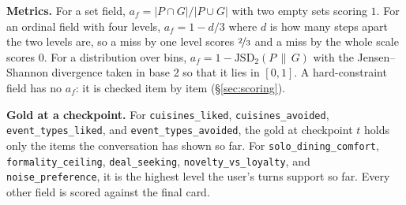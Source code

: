 \documentclass{article}
\begin{document}
\textbf{Metrics.} For a set field, $a_f=|P\cap G|/|P\cup G|$ with two empty sets scoring $1$.
For an ordinal field with four levels, $a_f=1-d/3$ where $d$ is how many steps apart
the two levels are, so a miss by one level scores $\nicefrac{2}{3}$ and a miss by the whole scale scores
$0$. For a distribution over bins,
$a_f=1-\mathrm{JSD}_2(P\,\|\,G)$ with the Jensen--Shannon divergence taken in base 2 so that it
lies in $[0,1]$. A hard-constraint field has no $a_f$: it is checked item by item
(\S\ref{sec:scoring}).

\textbf{Gold at a checkpoint.} For \texttt{cuisines\_liked}, \texttt{cuisines\_avoided},
\texttt{event\_types\_liked}, and \texttt{event\_types\_avoided}, the gold at checkpoint $t$ holds
only the items the conversation has shown so far. For \texttt{solo\_dining\_comfort},
\texttt{formality\_ceiling}, \texttt{deal\_seeking}, \texttt{novelty\_vs\_loyalty}, and
\texttt{noise\_preference}, it is the highest level the user's turns support so far. Every other
field is scored against the final card.
\end{document}
